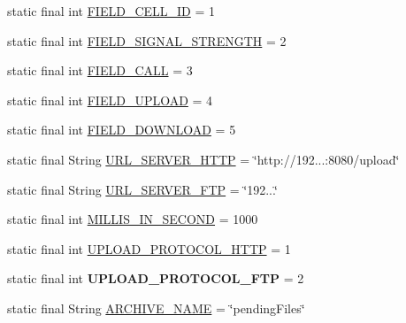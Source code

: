\begin{DoxyCompactItemize}
\item 
static final int \hyperlink{classcom_1_1qualoutdoor_1_1recorder_1_1QualOutdoorRecorderApp_abe439853b2cd271963db8b6f2a1c4891}{F\-I\-E\-L\-D\-\_\-\-C\-E\-L\-L\-\_\-\-I\-D} = 1
\item 
static final int \hyperlink{classcom_1_1qualoutdoor_1_1recorder_1_1QualOutdoorRecorderApp_a4af1523555b51f952dbaa6698dd9aa02}{F\-I\-E\-L\-D\-\_\-\-S\-I\-G\-N\-A\-L\-\_\-\-S\-T\-R\-E\-N\-G\-T\-H} = 2
\item 
static final int \hyperlink{classcom_1_1qualoutdoor_1_1recorder_1_1QualOutdoorRecorderApp_a56647485a7e66a2d1c80785e29ae89e7}{F\-I\-E\-L\-D\-\_\-\-C\-A\-L\-L} = 3
\item 
static final int \hyperlink{classcom_1_1qualoutdoor_1_1recorder_1_1QualOutdoorRecorderApp_a21754ac1732eb993a9deff0578d72ebc}{F\-I\-E\-L\-D\-\_\-\-U\-P\-L\-O\-A\-D} = 4
\item 
static final int \hyperlink{classcom_1_1qualoutdoor_1_1recorder_1_1QualOutdoorRecorderApp_a276550e7468a714c591dcba65ec4b772}{F\-I\-E\-L\-D\-\_\-\-D\-O\-W\-N\-L\-O\-A\-D} = 5
\item 
static final String \hyperlink{classcom_1_1qualoutdoor_1_1recorder_1_1QualOutdoorRecorderApp_a6045fe80259e1789ab9d7806fc8c2178}{U\-R\-L\-\_\-\-S\-E\-R\-V\-E\-R\-\_\-\-H\-T\-T\-P} = \char`\"{}http\-://192...\-:8080/upload\char`\"{}
\item 
static final String \hyperlink{classcom_1_1qualoutdoor_1_1recorder_1_1QualOutdoorRecorderApp_ac63e83b0eab8b98255d8e7f01eaa9632}{U\-R\-L\-\_\-\-S\-E\-R\-V\-E\-R\-\_\-\-F\-T\-P} = \char`\"{}192...\char`\"{}
\item 
static final int \hyperlink{classcom_1_1qualoutdoor_1_1recorder_1_1QualOutdoorRecorderApp_a23686d98fcd161d744bd9ed2467562be}{M\-I\-L\-L\-I\-S\-\_\-\-I\-N\-\_\-\-S\-E\-C\-O\-N\-D} = 1000
\item 
static final int \hyperlink{classcom_1_1qualoutdoor_1_1recorder_1_1QualOutdoorRecorderApp_aeffaab2e4e965b41b3d96a8f04ecb043}{U\-P\-L\-O\-A\-D\-\_\-\-P\-R\-O\-T\-O\-C\-O\-L\-\_\-\-H\-T\-T\-P} = 1
\item 
\hypertarget{classcom_1_1qualoutdoor_1_1recorder_1_1QualOutdoorRecorderApp_a6b06dee1b457a802556b6ee4b806db6d}{static final int {\bfseries U\-P\-L\-O\-A\-D\-\_\-\-P\-R\-O\-T\-O\-C\-O\-L\-\_\-\-F\-T\-P} = 2}\label{classcom_1_1qualoutdoor_1_1recorder_1_1QualOutdoorRecorderApp_a6b06dee1b457a802556b6ee4b806db6d}

\item 
static final String \hyperlink{classcom_1_1qualoutdoor_1_1recorder_1_1QualOutdoorRecorderApp_afbca072ac6fb09da0983bad3b41c9f55}{A\-R\-C\-H\-I\-V\-E\-\_\-\-N\-A\-M\-E} = \char`\"{}pending\-Files\char`\"{}
\end{DoxyCompactItemize}
